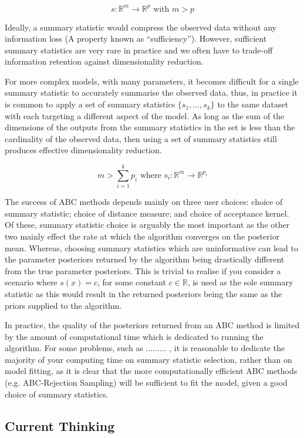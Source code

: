 \documentclass[11pt,a4paper,margin=0]{article}
\begin{document}
\[ s:\mathbb{R}^m\to\mathbb{R}^p\text{ with }m>p \]

Ideally, a summary statistic would compress the observed data without any information loss (A property known as ``sufficiency''). However, sufficient summary statistics are very rare in practice and we often have to trade-off information retention against dimensionality reduction.

\par For more complex models, with many parameters, it becomes difficult for a single summary statistic to accurately summarise the observed data, thus, in practice it is common to apply a set of summary statistics $\{s_1,\dots,s_k\}$ to the same dataset with each targeting a different aspect of the model. As long as the sum of the dimensions of the outputs from the summary statistics in the set is less than the cardinality of the observed data, then using a set of summary statistics still produces effective dimensionality reduction.

\[ m>\sum_{i=1}^kp_i\text{ where }s_i:\mathbb{R}^m\to\mathbb{R}^{p_i} \]

The success of ABC methods depends mainly on three user choices: choice of summary statistic; choice of distance measure; and choice of acceptance kernel. Of these, summary statistic choice is arguably the most important as the other two mainly effect the rate at which the algorithm converges on the posterior mean. Whereas, choosing summary statistics which are uninformative can lead to the parameter posteriors returned by the algorithm being drastically different from the true parameter posteriors. This is trivial to realise if you consider a scenario where $s(x)=c$, for some constant $c\in\mathbb{R}$, is used as the sole summary statistic as this would result in the returned posteriors being the same as the priors supplied to the algorithm.

\par In practice, the quality of the posteriors returned from an ABC method is limited by the amount of computational time which is dedicated to running the algorithm. For some problems, such as ......... %
, it is reasonable to dedicate the majority of your computing time on summary statistic selection, rather than on model fitting, as it is clear that the more computationally efficient ABC methods (e.g. ABC-Rejection Sampling) will be sufficient to fit the model, given a good choice of summary statistics.

\subsection*{Current Thinking}\label{sec_summary_stats_current_thinking}
\end{document}
